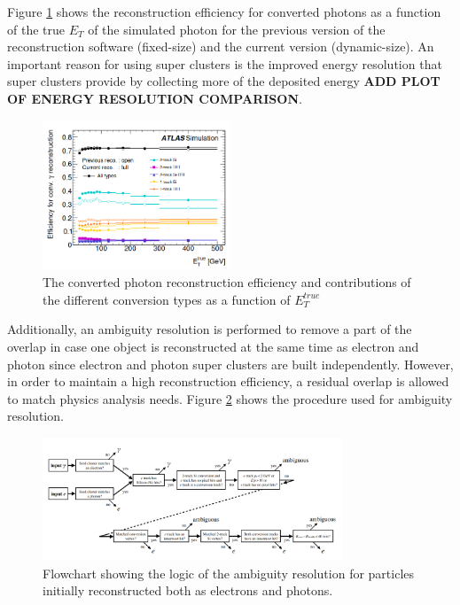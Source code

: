 Figure \ref{fig:chap2:Objects:Egamma:Gamma:Conv:Reco:Eff} shows the reconstruction efficiency for converted photons as a function of the true $E_T$ of the simulated photon for the previous version of the reconstruction software (fixed-size) and the current version (dynamic-size). An important reason for using super clusters is the improved energy resolution that super clusters provide by collecting more of the deposited energy \textbf{ADD PLOT OF ENERGY RESOLUTION COMPARISON}.
\begin{figure}[H]
    \centering
    \includegraphics[width=0.5\textwidth]{Ch2/Img/Photon_conv_Reco_Eff.png}
    \caption{The converted photon reconstruction efficiency and contributions of the different conversion types as a function of $E^{true}_T$}
    \label{fig:chap2:Objects:Egamma:Gamma:Conv:Reco:Eff}
\end{figure}

Additionally, an ambiguity resolution is performed to remove a part of the overlap in case one object is reconstructed at the same time as electron and photon since electron and photon super clusters are built independently. However, in order to maintain a high reconstruction efficiency, a residual overlap is allowed to match physics analysis needs. Figure \ref{fig:chap2:Objects:Egamma:Ambg} shows the procedure used for ambiguity resolution. 
\begin{figure}[H]
    \centering
    \includegraphics[width=0.8\textwidth]{Ch2/Img/Ambiguity.png}
    \caption{Flowchart showing the logic of the ambiguity resolution for particles initially reconstructed both as electrons and photons.}
    \label{fig:chap2:Objects:Egamma:Ambg}
\end{figure}

